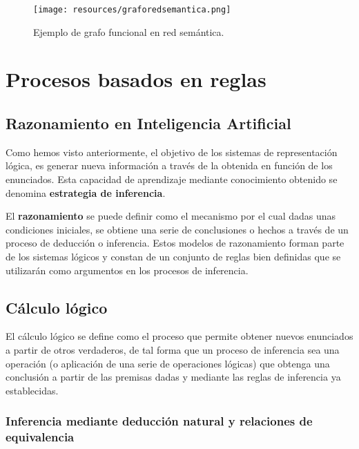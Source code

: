 \documentclass[a4paper, 11pt, titlepage]{article}
\begin{document}
        \begin{figure}[htp]
            \centering
            \texttt{[image: resources/graforedsemantica.png]}
            \caption{Ejemplo de grafo funcional en red semántica.}
            \label{graforedsemantica}
        \end{figure}    

\section{Procesos basados en reglas}

    \subsection{Razonamiento en Inteligencia Artificial}

        Como hemos visto anteriormente, el objetivo de los sistemas de representación lógica, es 
        generar nueva información a través de la obtenida en función de los enunciados. Esta capacidad 
        de aprendizaje mediante conocimiento obtenido se denomina \textbf{estrategia de inferencia}.

        El \textbf{razonamiento} se puede definir como el mecanismo por el cual dadas unas 
        condiciones iniciales, se obtiene una serie de conclusiones o hechos a través de un proceso 
        de deducción o inferencia. Estos modelos de razonamiento forman parte de los sistemas 
        lógicos y constan de un conjunto de reglas bien definidas que se utilizarán como argumentos 
        en los procesos de inferencia.

    \subsection{Cálculo lógico}

        El cálculo lógico se define como el proceso que permite obtener nuevos enunciados a 
        partir de otros verdaderos, de tal forma que un proceso de inferencia sea una operación (o 
        aplicación de una serie de operaciones lógicas) que obtenga una conclusión a partir de las 
        premisas dadas y mediante las reglas de inferencia ya establecidas.

        \subsubsection{Inferencia mediante deducción natural y relaciones de equivalencia}
\end{document}
